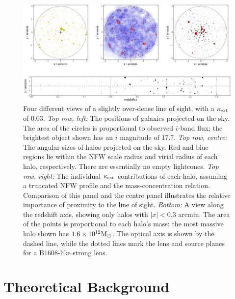 \documentclass[useAMS,usenatbib,a4paper]{mn2e}
\begin{document}
\begin{figure}
\includegraphics[width=\textwidth]{figs/viewofalightcone.eps}
\caption[magcut]{Four different views of a slightly over-dense \MS line
of sight, with a $\kappa_{\rm ext}$ of 0.03. 
{\it Top row, left:} The positions of galaxies projected on the sky. The area
of the circles is proportional to observed $i$-band flux; the brightest
object shown has an $i$ magnitude of 17.7. 
{\it Top row, centre:} The angular sizes of halos projected on the sky.
Red and blue regions lie within the NFW scale radius and virial radius
of each halo, respectively. There are essentially no empty lightcones. 
{\it Top row, right:} The individual $\kappa_{\rm ext}$ contributions of
each halo, assuming a \citet{BMO} truncated NFW 
profile and the \citet{Neto2007}
mass-concentration relation. Comparison of
this panel and the centre panel illustrates the relative importance of
proximity to the line of sight.
{\it Bottom:} A view along the redshift axis, showing only halos with
$|x|<0.3$ arcmin. The area of the points is proportional to each halo's
mass: the most massive halo shown has $1.6\times10^{12}\Msun$. The
optical axis is shown by the dashed line, while the dotted lines mark
the lens and source planes for a B1608-like strong lens.}
\label{fig:lightcone}
\end{figure}




\section{Theoretical Background}
\label{sec:theory}
\end{document}
